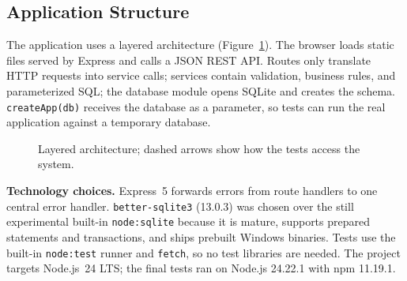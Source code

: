 \documentclass[11pt,a4paper]{article}
\begin{document}
\subsection{Application Structure}

The application uses a layered architecture (Figure~\ref{fig:architecture}).
The browser loads static files served by Express and calls a JSON REST
API. Routes only translate HTTP requests into service calls; services
contain validation, business rules, and parameterized SQL; the database
module opens SQLite and creates the schema. \texttt{createApp(db)}
receives the database as a parameter, so tests can run the real
application against a temporary database.

\begin{figure}[htbp]
\centering
{}
\caption{Layered architecture; dashed arrows show how the tests access the system.}
\label{fig:architecture}
\end{figure}

\textbf{Technology choices.} Express~5 forwards errors from route
handlers to one central error handler. \texttt{better-sqlite3} (13.0.3)
was chosen over the still experimental built-in \texttt{node:sqlite}
because it is mature, supports prepared statements and transactions, and
ships prebuilt Windows binaries. Tests use the built-in
\texttt{node:test} runner and \texttt{fetch}, so no test libraries are
needed. The project targets Node.js~24 LTS; the final tests ran on
Node.js 24.22.1 with npm 11.19.1.
\end{document}
